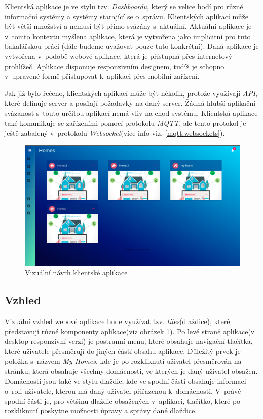 Klientská aplikace je ve stylu tzv. \emph{Dashboardu}, který se velice hodí pro různé informační systémy a systémy starající se o~správu.
Klientských aplikací může být větší množství a nemusí být přímo svázány s~aktuální.
Aktuální aplikace je v~tomto kontextu myšlena aplikace, která je vytvořena jako implicitní pro tuto bakalářskou práci (dále budeme uvažovat pouze tuto konkrétní).
Daná aplikace je vytvořena v~podobě webové aplikace, která je přístupná přes internetový prohlížeč.
Aplikace disponuje responzivním designem, tudíž je schopno v~upravené formě přistupovat k~aplikaci přes mobilní zařízení.

Jak již bylo řečeno, klientských aplikací může být několik, protože využívají \emph{API}, které definuje server a posílají požadavky na daný server.
Žádná hlubší aplikační svázanost s~touto určitou aplikací nemá vliv na chod systému.
Klientská aplikace také komunikuje se zařízeními pomocí protokolu \emph{MQTT}, ale tento protokol je ještě zabalený v~protokolu \emph{Websocket}(více info viz. \ref{mqtt:websockets}).

\begin{figure}[hbt]
  \centering
  \includegraphics[width=0.9 \linewidth]{obrazky-figures/mockup.png}
  \caption{Vizuální návrh klientské aplikace}
  \label{figure:design}
\end{figure}

\newpage
\subsection*{Vzhled}
\label{frontend:vzhled}
Vizuální vzhled webové aplikace bude využívat tzv. \emph{tiles}(dlaždice), které představují různé komponenty aplikace(viz obrázek \ref{figure:design}).
Po levé straně aplikace(v desktop responzivní verzi) je postranní menu, které obsahuje navigační tlačítka, které uživatele přesměrují do jiných částí obsahu aplikace.
Důležitý prvek je položka s~názvem \emph{My Homes}, kde je po rozkliknutí uživatel přesměrován na stránku, která obsahuje všechny domácnosti, ve kterých je daný uživatel obsažen.
Domácnosti jsou také ve stylu dlaždic, kde ve spodní části obsahuje informaci o~roli uživatele, kterou má daný uživatel přiřazenou k~domácnosti.
V~právé spodní části je, pro většinu dlaždic obsažených v~aplikaci, tlačítko, které po rozkliknutí poskytne možnosti úpravy a správy dané dlaždice.

